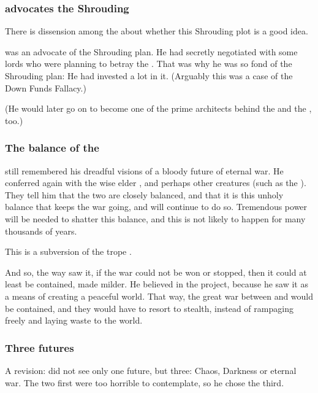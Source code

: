 \subsubsection{\Ishnaruchaefir{} advocates the Shrouding}
There is dissension among the \dragons{} about whether this Shrouding plot is a good idea. 

\Ishnaruchaefir{} was an advocate of the Shrouding plan. 
He had secretly negotiated with some \resphan{} lords who were planning to betray the \banes. 
That was why he was so fond of the Shrouding plan: 
He had invested a lot in it. 
(Arguably this was a case of the Down Funds Fallacy.)

(He would later go on to become one of the prime architects behind the  and the , too.) 





\subsubsection{The balance of the \matrices}
\Ishnaruchaefir{} still remembered his dreadful visions of a bloody future of eternal war. He conferred again with the wise elder \ophidians, \nagae{} and perhaps other creatures (such as the ). 
They tell him that the two \matrices{} are closely balanced, and that it is this unholy balance that keeps the war going, and will continue to do so. 
Tremendous \vertex{} power will be needed to shatter this balance, and this is not likely to happen for many thousands of years. 

This is a subversion of the trope .

And so, the way \Ishnaruchaefir{} saw it, if the war could not be won or stopped, then it could at least be contained, made milder. He believed in the \charade{} project, because he saw it as a means of creating a peaceful world. That way, the great war between \dragons{} and \banes{} would be contained, and they would have to resort to stealth, instead of rampaging freely and laying waste to the world. 





\subsubsection{Three futures}
A revision: 
\Ishnaruchaefir{} did not see only one future, but three: 
Chaos, Darkness or eternal war. 
The two first were too horrible to contemplate, so he chose the third. 

